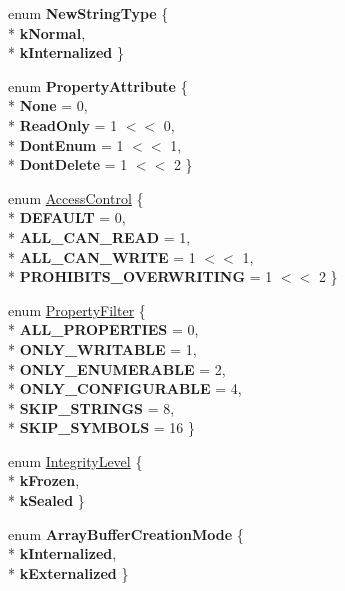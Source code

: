 \begin{DoxyCompactItemize}
\item 
enum {\bfseries New\+String\+Type} \{ \\*
{\bfseries k\+Normal}, 
\\*
{\bfseries k\+Internalized}
 \}\hypertarget{namespacev8_ac9163ab12fb3b2a95907a3a0367c6095}{}\label{namespacev8_ac9163ab12fb3b2a95907a3a0367c6095}

\item 
enum {\bfseries Property\+Attribute} \{ \\*
{\bfseries None} = 0, 
\\*
{\bfseries Read\+Only} = 1 $<$$<$ 0, 
\\*
{\bfseries Dont\+Enum} = 1 $<$$<$ 1, 
\\*
{\bfseries Dont\+Delete} = 1 $<$$<$ 2
 \}\hypertarget{namespacev8_a05f25f935e108a1ea2d150e274602b87}{}\label{namespacev8_a05f25f935e108a1ea2d150e274602b87}

\item 
enum \hyperlink{namespacev8_a31d8355cb043d7d2dda3f4a52760b64e}{Access\+Control} \{ \\*
{\bfseries D\+E\+F\+A\+U\+LT} = 0, 
\\*
{\bfseries A\+L\+L\+\_\+\+C\+A\+N\+\_\+\+R\+E\+AD} = 1, 
\\*
{\bfseries A\+L\+L\+\_\+\+C\+A\+N\+\_\+\+W\+R\+I\+TE} = 1 $<$$<$ 1, 
\\*
{\bfseries P\+R\+O\+H\+I\+B\+I\+T\+S\+\_\+\+O\+V\+E\+R\+W\+R\+I\+T\+I\+NG} = 1 $<$$<$ 2
 \}
\item 
enum \hyperlink{namespacev8_afbf02b6b1152a3e25d7bde90798209ac}{Property\+Filter} \{ \\*
{\bfseries A\+L\+L\+\_\+\+P\+R\+O\+P\+E\+R\+T\+I\+ES} = 0, 
\\*
{\bfseries O\+N\+L\+Y\+\_\+\+W\+R\+I\+T\+A\+B\+LE} = 1, 
\\*
{\bfseries O\+N\+L\+Y\+\_\+\+E\+N\+U\+M\+E\+R\+A\+B\+LE} = 2, 
\\*
{\bfseries O\+N\+L\+Y\+\_\+\+C\+O\+N\+F\+I\+G\+U\+R\+A\+B\+LE} = 4, 
\\*
{\bfseries S\+K\+I\+P\+\_\+\+S\+T\+R\+I\+N\+GS} = 8, 
\\*
{\bfseries S\+K\+I\+P\+\_\+\+S\+Y\+M\+B\+O\+LS} = 16
 \}
\item 
enum \hyperlink{namespacev8_a02642d03ff1eecc2fd358626499c2e30}{Integrity\+Level} \{ \\*
{\bfseries k\+Frozen}, 
\\*
{\bfseries k\+Sealed}
 \}
\item 
enum {\bfseries Array\+Buffer\+Creation\+Mode} \{ \\*
{\bfseries k\+Internalized}, 
\\*
{\bfseries k\+Externalized}
 \}\hypertarget{namespacev8_aead63bf88a59e18b3768de9ac8d4b98d}{}\label{namespacev8_aead63bf88a59e18b3768de9ac8d4b98d}


\end{DoxyCompactItemize}
